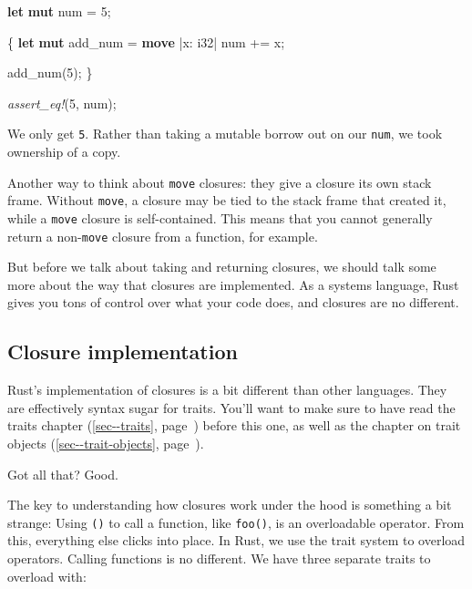 \documentclass[a4paper,]{book}
\renewcommand*{\hyperref}[2][\ar]{%
  \def\ar{#2}%
  #2 (\autoref{#1}, page~\pageref{#1})}
\newenvironment{Shaded}{\begin{snugshade}}{\end{snugshade}}
\newcommand{\KeywordTok}[1]{\textcolor[rgb]{0.13,0.29,0.53}{\textbf{{#1}}}}
\newcommand{\DataTypeTok}[1]{\textcolor[rgb]{0.13,0.29,0.53}{{#1}}}
\newcommand{\DecValTok}[1]{\textcolor[rgb]{0.00,0.00,0.81}{{#1}}}
\newcommand{\PreprocessorTok}[1]{\textcolor[rgb]{0.56,0.35,0.01}{\textit{{#1}}}}
\newcommand{\NormalTok}[1]{{#1}}
\begin{document}
\begin{Shaded}
\begin{Highlighting}[]
\KeywordTok{let} \KeywordTok{mut} \NormalTok{num = }\DecValTok{5}\NormalTok{;}

\NormalTok{\{}
    \KeywordTok{let} \KeywordTok{mut} \NormalTok{add_num = }\KeywordTok{move} \NormalTok{|x: }\DataTypeTok{i32}\NormalTok{| num += x;}

    \NormalTok{add_num(}\DecValTok{5}\NormalTok{);}
\NormalTok{\}}

\PreprocessorTok{assert_eq!}\NormalTok{(}\DecValTok{5}\NormalTok{, num);}
\end{Highlighting}
\end{Shaded}

We only get \texttt{5}. Rather than taking a mutable borrow out on our
\texttt{num}, we took ownership of a copy.

Another way to think about \texttt{move} closures: they give a closure
its own stack frame. Without \texttt{move}, a closure may be tied to the
stack frame that created it, while a \texttt{move} closure is
self-contained. This means that you cannot generally return a
non-\texttt{move} closure from a function, for example.

But before we talk about taking and returning closures, we should talk
some more about the way that closures are implemented. As a systems
language, Rust gives you tons of control over what your code does, and
closures are no different.

\subsection{Closure implementation}\label{closure-implementation}

Rust's implementation of closures is a bit different than other
languages. They are effectively syntax sugar for traits. You'll want to
make sure to have read the \hyperref[sec--traits]{traits chapter} before
this one, as well as the chapter on \hyperref[sec--trait-objects]{trait
objects}.

Got all that? Good.

The key to understanding how closures work under the hood is something a
bit strange: Using \texttt{()} to call a function, like \texttt{foo()},
is an overloadable operator. From this, everything else clicks into
place. In Rust, we use the trait system to overload operators. Calling
functions is no different. We have three separate traits to overload
with:
\end{document}
